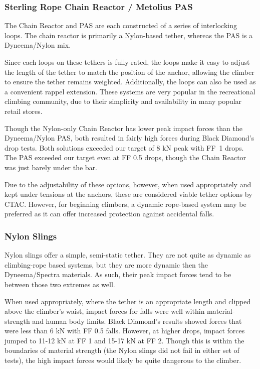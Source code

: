 \documentclass[nonacm,acmtog]{acmart}
\begin{document}
\subsubsection{Sterling Rope Chain Reactor / Metolius PAS}

   The Chain Reactor and PAS are each constructed of a series of interlocking
   loops.  The chain reactor is primarily a Nylon-based tether, whereas the PAS
   is a Dyneema/Nylon mix.

   Since each loops on these tethers is fully-rated, the loops make it
   easy to adjust the length of the tether to match the position of the anchor,
   allowing the climber to ensure the tether remains weighted.  Additionally,
   the loops can also be used as a convenient rappel extension.  These systems
   are very popular in the recreational climbing community, due to their
   simplicity and availability in many popular retail stores.

   Though the Nylon-only Chain Reactor has lower peak impact forces than the
   Dyneema/Nylon PAS, both resulted in fairly high forces during Black
   Diamond's drop tests.  Both solutions exceeded our target of 8 kN peak with
   FF~1 drops.  The PAS exceeded our target even at FF 0.5 drops, though the
   Chain Reactor was just barely under the bar.

   Due to the adjustability of these options, however, when used appropriately
   and kept under tensions at the anchors, these are considered viable tether
   options by CTAC.  However, for beginning climbers, a dynamic rope-based
   system may be preferred as it can offer increased protection against
   accidental falls.

\subsubsection{Nylon Slings}

   Nylon slings offer a simple, semi-static tether.  They are not quite as
   dynamic as climbing-rope based systems, but they are more dynamic then the
   Dyneema/Spectra materials. As such, their peak impact forces tend to be
   between those two extremes as well.

   When used appropriately, where the tether is an appropriate length and
   clipped above the climber's waist, impact forces for falls were well within
   material-strength and human body limits.  Black Diamond's results showed
   forces that were less than 6 kN with FF 0.5 falls.  However, at higher
   drops, impact forces jumped to 11-12 kN at FF 1 and 15-17 kN at FF 2.
   Though this is within the boundaries of material strength (the Nylon slings
   did not fail in either set of tests), the high impact forces would likely be
   quite dangerous to the climber.
\end{document}
